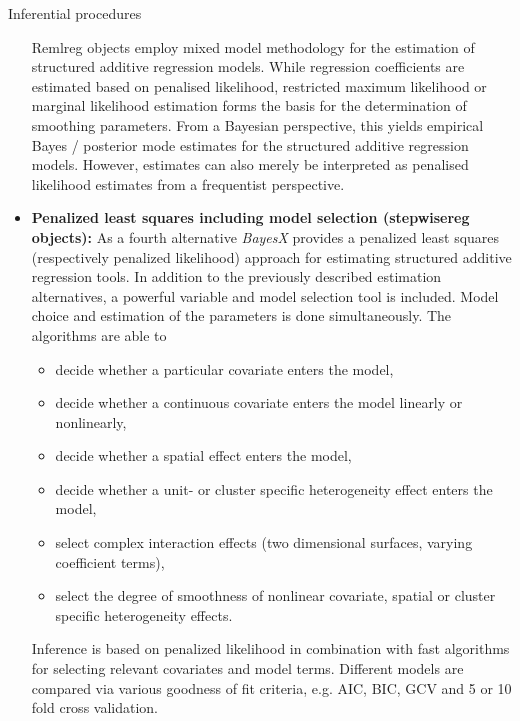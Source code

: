 \begin{stanza}{Inferential procedures}
\begin{itemize}
    Remlreg objects employ mixed model methodology for the estimation of structured additive regression models. While
    regression coefficients are estimated based on penalised likelihood, restricted maximum likelihood or marginal
    likelihood estimation forms the basis for the determination of smoothing parameters. From a Bayesian perspective, this
    yields empirical Bayes / posterior mode estimates for the structured additive regression models. However, estimates can
    also merely be interpreted as penalised likelihood estimates from a frequentist perspective.
\item{\bf \sffamily Penalized least squares including model selection (stepwisereg objects):}
As a fourth alternative {\em BayesX} provides a penalized least squares (respectively penalized likelihood) approach for
estimating structured additive regression tools.
In addition to
the previously described estimation alternatives, a powerful variable and model selection tool is included.  Model choice and estimation of
the parameters is done simultaneously. The algorithms are able to
\begin{itemize}
\item decide whether a particular covariate enters the model,
\item decide whether a continuous covariate enters the model linearly or nonlinearly,
\item decide whether a spatial effect enters the model,
\item decide whether a unit- or cluster specific heterogeneity effect enters the model,
\item select complex interaction effects (two dimensional surfaces, varying coefficient terms),
\item select the degree of smoothness of  nonlinear covariate, spatial or cluster specific heterogeneity effects.
\end{itemize}
Inference is based on penalized likelihood in combination with fast
algorithms for selecting relevant covariates and model terms.
Different models are compared via various goodness of fit criteria,
e.g. AIC, BIC, GCV and 5 or 10 fold cross validation.
\end{itemize}
\end{stanza}


